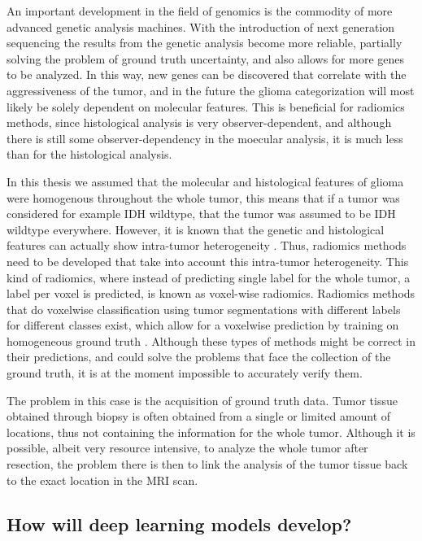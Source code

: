 An important development in the field of genomics is the commodity of more advanced genetic analysis machines.
With the introduction of next generation sequencing the results from the genetic analysis become more reliable, partially solving the problem of ground truth uncertainty, and also allows for more genes to be analyzed.
In this way, new genes can be discovered that correlate with the aggressiveness of the \gls{tumor}, and in the future the glioma categorization will most likely be solely dependent on molecular features.
This is beneficial for radiomics methods, since histological analysis is very observer-dependent, and although there is still some observer-dependency in the moecular analysis, it is much less than for the histological analysis.

In this thesis we assumed that the molecular and histological features of glioma were homogenous throughout the whole \gls{tumor}, this means that if a \gls{tumor} was considered for example \gls{IDH} wildtype, that the \gls{tumor} was assumed to be \gls{IDH} wildtype everywhere.
However, it is known that the genetic and histological features can actually show intra-tumor heterogeneity \autocite{eder2014heterogeneity}.
Thus, radiomics methods need to be developed that take into account this intra-tumor heterogeneity.
This kind of radiomics, where instead of predicting single label for the whole \gls{tumor}, a label per voxel is predicted, is known as voxel-wise radiomics.
Radiomics methods that do voxelwise classification using \gls{tumor} segmentations with different labels for different classes exist, which allow for a voxelwise prediction by training on homogeneous ground truth \autocite{yogananda20201p19q}.
Although these types of methods might be correct in their predictions, and could solve the problems that face the collection of the ground truth, it is at the moment impossible to accurately verify them.


The problem in this case is the acquisition of ground truth data.
Tumor tissue obtained through biopsy is often obtained from a single or limited amount of locations, thus not containing the information for the whole \gls{tumor}.
Although it is possible, albeit very resource intensive, to analyze the whole \gls{tumor} after resection, the problem there is then to link the analysis of the \gls{tumor} tissue back to the exact location in the \gls{MRI} scan.

\subsection{How will deep learning models develop?}

